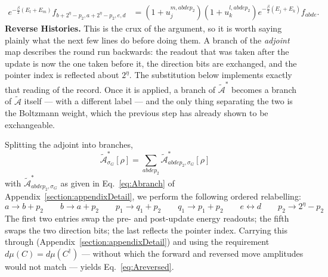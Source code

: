 \documentclass[aps,floatfix,10pt,amssymb,amsfont,amsmath,superscriptaddress,float,nofootinbib,longbibliography,nobalancelastpage,twocolumn]{revtex4-2}
\begin{document}
\begin{widetext}
\begin{equation}
\begin{aligned}
e^{-\frac{\beta}{2}(E_l+E_m)}f_{b+2^{\eta}-p_2,a+2^{\eta}-p_2,e,d}
&=(1+u_j^{m,abdep_2})(1+u_k^{l,abdep_2})e^{-\frac{\beta}{2}(E_j+E_k)}f_{abde}.
\end{aligned}
\label{eq:fabtofba}
\end{equation}
\textbf{Reverse Histories.} This is the crux of the argument, so it is worth saying plainly what the next few lines do before doing them. A branch of the \emph{adjoint} map describes the round run backwards: the readout that was taken after the update is now the one taken before it, the direction bits are exchanged, and the pointer index is reflected about $2^{\eta}$. The substitution below implements exactly that reading of the record. Once it is applied, a branch of $\tilde{\mathcal{A}}^*$ becomes a branch of $\tilde{\mathcal{A}}$ itself --- with a different label --- and the only thing separating the two is the Boltzmann weight, which the previous step has already shown to be exchangeable.

Splitting the adjoint into branches,
\begin{equation}
    \tilde{\mathcal{A}}^*_{\sigma_G}[\rho] =  \sum_{abdep_2}\tilde{\mathcal{A}}^*_{abdep_2,\sigma_G}[\rho]
\end{equation}
with $\tilde{\mathcal{A}}^*_{abdep_2,\sigma_G}$ as given in Eq.~\eqref{eq:Abranch} of Appendix~\ref{section:appendixDetail}, we perform the following ordered relabelling:
\begin{equation}
    a \rightarrow b+p_2 \qquad b\rightarrow a+p_2 \qquad p_1 \rightarrow q_1+ p_2 \qquad q_1 \rightarrow p_1 + p_2 \qquad e \leftrightarrow d \qquad p_2 \rightarrow 2^{\eta}-p_2
    \label{eq:Arelabel}
\end{equation}
The first two entries swap the pre- and post-update energy readouts; the fifth swaps the two direction bits; the last reflects the pointer index. Carrying this through (Appendix~\ref{section:appendixDetail}) and using the requirement $d\mu(C)=d\mu(C^{\dagger})$ --- without which the forward and reversed move amplitudes would not match --- yields Eq.~\eqref{eq:Areversed}.


\end{widetext}
\end{document}
